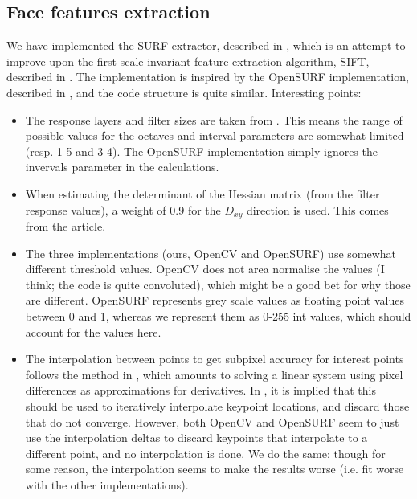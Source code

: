 \subsection{Face features extraction}
We have implemented the SURF extractor, described in \cite{SURF},
which is an attempt to improve upon the first scale-invariant feature
extraction algorithm, SIFT, described in \cite{SIFT}. The
implementation is inspired by the OpenSURF implementation, described
in \cite{OpenSURF}, and the code structure is quite similar.
Interesting points:

\begin{itemize}
\item The response layers and filter sizes are taken from \cite{SURF}.
  This means the range of possible values for the octaves and interval
  parameters are somewhat limited (resp. 1-5 and 3-4). The OpenSURF
  implementation simply ignores the invervals parameter in the
  calculations.
\item When estimating the determinant of the Hessian matrix (from the
  filter response values), a weight of $0.9$ for the $D_{xy}$
  direction is used. This comes from the article.
\item The three implementations (ours, OpenCV and OpenSURF) use
  somewhat different threshold values. OpenCV does not area normalise
  the values (I think; the code is quite convoluted), which might be a
  good bet for why those are different. OpenSURF represents grey scale
  values as floating point values between 0 and 1, whereas we
  represent them as 0-255 int values, which should account for the
  values here.
\item The interpolation between points to get subpixel accuracy for
  interest points follows the method in \cite{inv-features}, which
  amounts to solving a linear system using pixel differences as
  approximations for derivatives. In \cite{SURF}, it is implied that
  this should be used to iteratively interpolate keypoint locations,
  and discard those that do not converge. However, both OpenCV and
  OpenSURF seem to just use the interpolation deltas to discard
  keypoints that interpolate to a different point, and no
  interpolation is done. We do the same; though for some reason, the
  interpolation seems to make the results worse (i.e. fit worse with
  the other implementations).
\end{itemize}
